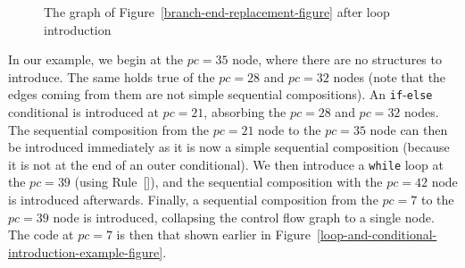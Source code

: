 \begin{figure}
  \begin{center}
  \end{center}
  \caption{The graph of Figure~\ref{branch-end-replacement-figure} after loop introduction}
  \label{branch-end-reduction-figure}
\end{figure}

In our example, we begin at the $pc=35$ node, where there are no
structures to introduce. 
The same holds true of the $pc=28$ and $pc=32$ nodes (note that the
edges coming from them are not simple sequential compositions).
An \texttt{if}-\texttt{else} conditional is introduced at $pc=21$,
absorbing the $pc=28$ and $pc=32$ nodes.
The sequential composition from the $pc=21$ node to the $pc=35$ node
can then be introduced immediately as it is now a simple sequential
composition (because it is not at the end of an outer conditional).
We then introduce a \texttt{while} loop at the $pc=39$ (using
Rule~[]), and the sequential
composition with the $pc=42$ node is introduced afterwards.
Finally, a sequential composition from the $pc=7$ to the $pc=39$ node
is introduced, collapsing the control flow graph to a single node.
The code at $pc=7$ is then that shown earlier in
Figure~\ref{loop-and-conditional-introduction-example-figure}.
